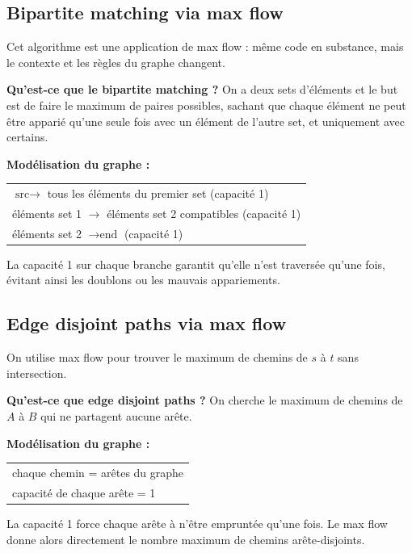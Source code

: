 \documentclass[11pt,a4paper,openany]{book}
\begin{document}
\subsection{Bipartite matching via max flow}

\begin{exbox}[title=Bipartite matching via max flow — student notes]
\small\raggedright
Cet algorithme est une application de max flow : même code en substance, mais le
contexte et les règles du graphe changent.

\textbf{Qu'est-ce que le bipartite matching ?} On a deux sets d'éléments et le but
est de faire le maximum de paires possibles, sachant que chaque élément ne peut être
apparié qu'une seule fois avec un élément de l'autre set, et uniquement avec certains.

\textbf{Modélisation du graphe :}
\begin{center}
\begin{tabular}{l}
$\text{src} \to$ tous les éléments du premier set (capacité 1) \\
éléments set 1 $\to$ éléments set 2 compatibles (capacité 1) \\
éléments set 2 $\to \text{end}$ (capacité 1)
\end{tabular}
\end{center}

La capacité 1 sur chaque branche garantit qu'elle n'est traversée qu'une fois, évitant
ainsi les doublons ou les mauvais appariements.
\end{exbox}

\subsection{Edge disjoint paths via max flow}

\begin{exbox}[title=Edge disjoint paths via max flow — student notes]
\small\raggedright
On utilise max flow pour trouver le maximum de chemins de $s$ à $t$ sans intersection.

\textbf{Qu'est-ce que edge disjoint paths ?} On cherche le maximum de chemins de $A$
à $B$ qui ne partagent aucune arête.

\textbf{Modélisation du graphe :}
\begin{center}
\begin{tabular}{l}
chaque chemin = arêtes du graphe \\
capacité de chaque arête = 1
\end{tabular}
\end{center}

La capacité 1 force chaque arête à n'être empruntée qu'une fois. Le max flow donne
alors directement le nombre maximum de chemins arête-disjoints.
\end{exbox}
\end{document}
